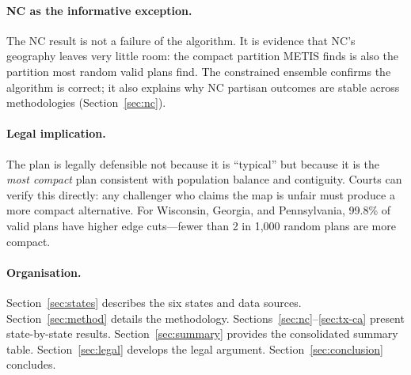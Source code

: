 \paragraph{NC as the informative exception.}
The NC result is not a failure of the algorithm.  It is evidence that NC's
geography leaves very little room: the compact partition METIS finds is also
the partition most random valid plans find.  The constrained ensemble confirms
the algorithm is correct; it also explains why NC partisan outcomes are
stable across methodologies (Section~\ref{sec:nc}).

\paragraph{Legal implication.}
The \ar{} plan is legally defensible not because it is ``typical'' but because
it is the \emph{most compact} plan consistent with population balance and
contiguity.  Courts can verify this directly: any challenger who claims the map
is unfair must produce a more compact alternative.  For Wisconsin, Georgia, and
Pennsylvania, 99.8\% of valid plans have higher edge cuts---fewer than 2 in
1,000 random plans are more compact.

\paragraph{Organisation.}
Section~\ref{sec:states} describes the six states and data sources.
Section~\ref{sec:method} details the methodology.
Sections~\ref{sec:nc}--\ref{sec:tx-ca} present state-by-state results.
Section~\ref{sec:summary} provides the consolidated summary table.
Section~\ref{sec:legal} develops the legal argument.
Section~\ref{sec:conclusion} concludes.
